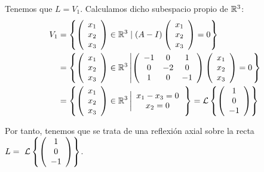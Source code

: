 \begin{ejercicio}
    Tenemos que $L=V_1$. Calculamos dicho subespacio propio de $\mathbb{R}^3$:
    \begin{equation*}\begin{split}
        V_1& = \left\{\left(\begin{array}{c}
            x_1\\x_2\\x_3
        \end{array}\right) \in \mathbb{R}^3 \mid (A-I)\left(\begin{array}{c}
            x_1\\x_2\\x_3
        \end{array}\right)=0\right\} \\
        & = \left\{\left(\begin{array}{c}
            x_1\\x_2\\x_3
        \end{array}\right) \in \mathbb{R}^3 \left| \left(\begin{array}{ccc}
            -1 & 0 & 1\\
            0 & -2 & 0 \\
            1 & 0 & -1
        \end{array}\right)\left(\begin{array}{c}
            x_1\\x_2\\x_3
        \end{array}\right)=0\right.\right\} \\
        & = \left\{\left(\begin{array}{c}
            x_1\\x_2\\x_3
        \end{array}\right) \in \mathbb{R}^3 \left| \begin{array}{c}
            x_1-x_3 = 0 \\
            x_2=0
        \end{array}\right.\right\}
        = \mathcal{L}\left\{\left(\begin{array}{c}
            1\\0\\-1
        \end{array}\right)\right\}
    \end{split}\end{equation*}

    Por tanto, tenemos que se trata de una reflexión axial sobre la recta $L=~\mathcal{L}\left\{\left(\begin{array}{c}
            1\\0\\-1
        \end{array}\right)\right\}$.
\end{ejercicio}

